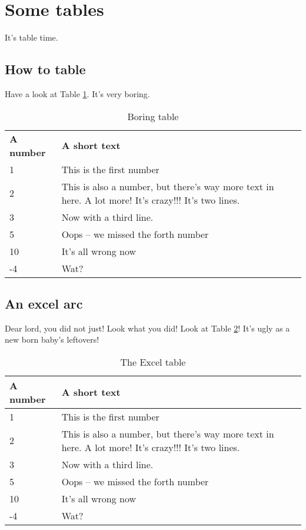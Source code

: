 \FloatBarrier
\section{Some tables}

It's table time.

\subsection{How to table}

Have a look at Table \ref{tab:boring}.
It's very boring.

\begin{table}[htbp]
	\centering
	\begin{tabularx}{\textwidth}{l X}
	\textbf{A number} & \textbf{A short text}  \\
	1 & This is the first number \\
	2 & This is also a number, but there's way more text in here. A lot more! It's crazy!!! It's two lines. \\
	3 & Now with a third line. \\
	5 & Oops -- we missed the forth number \\
	10 & It's all wrong now \\
	-4 & Wat?
	\end{tabularx}
	\caption{Boring table}
	\label{tab:boring}
\end{table}


\subsection{An excel arc}

Dear lord, you did not just!
Look what you did!
Look at Table \ref{tab:excel}! 
It's ugly as a new born baby's leftovers!

\begin{table}[htbp]
	\centering
	\begin{tabularx}{\textwidth}{| l | X |}
	\hline
	\textbf{A number} & \textbf{A short text}  \\ \hline
	1 & This is the first number \\ \hline
	2 & This is also a number, but there's way more text in here. A lot more! It's crazy!!! It's two lines. \\ \hline
	3 & Now with a third line. \\ \hline
	5 & Oops -- we missed the forth number \\ \hline
	10 & It's all wrong now \\ \hline
	-4 & Wat? \\ \hline
	\end{tabularx}
	\caption{The Excel table}
	\label{tab:excel}
\end{table}


